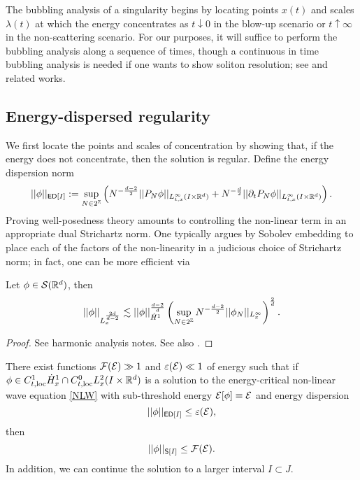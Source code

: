 
The bubbling analysis of a singularity begins by locating points $x(t)$ and scales $\lambda (t)$ at which the energy concentrates as $t \downarrow 0$ in the blow-up scenario or $t \uparrow \infty$ in the non-scattering scenario. For our purposes, it will suffice to perform the bubbling analysis along a sequence of times, though a continuous in time bubbling analysis is needed if one wants to show soliton resolution; see \cite{JendrejLawrie2023} and related works. 

\subsection{Energy-dispersed regularity}

We first locate the points and scales of concentration by showing that, if the energy does not concentrate, then the solution is regular. Define the energy dispersion norm
	\[
		||\phi||_{\mathsf{ED}[I]} 
			:= \sup_{N \in 2^\mathbb Z} \left( N^{-\frac{d - 2}{2}} ||P_N \phi||_{L^\infty_{t, x} (I \times \mathbb R^d)} + N^{ - \frac{d}{2}} ||\partial_t P_N \phi||_{L^\infty_{t, x} (I \times \mathbb R^d)} \right).
	\]
Proving well-posedness theory amounts to controlling the non-linear term in an appropriate dual Strichartz norm. One typically argues by Sobolev embedding to place each of the factors of the non-linearity in a judicious choice of Strichartz norm; in fact, one can be more efficient via

\begin{lemma}
	Let $\phi \in \mathcal S (\mathbb R^d)$, then 
		\begin{equation}
			||\phi||_{L^{\frac{2d}{d - 2}}_x} \lesssim ||\phi||_{\dot H^1}^{\frac{d - 2}{d}} \left( \sup_{N \in 2^\mathbb Z} N^{- \frac{d - 2}{2}}||\phi_N||_{L^\infty_x}\right)^{\frac2d}.
		\end{equation}
\end{lemma}

\begin{proof}
	See harmonic analysis notes. See also \cite[Theorem 2.43]{BahouriEtAl2011}.
\end{proof}

\begin{theorem}
	There exist functions $\mathcal F(\mathcal E) \gg 1$ and $\varepsilon(\mathcal E) \ll 1$ of energy such that if $\phi \in C^1_{t, \mathrm{loc}} \dot H^1_x \cap C^0_{t, \mathrm{loc}} L^2_x (I \times \mathbb R^d)$ is a solution to the energy-critical non-linear wave equation \eqref{NLW} with sub-threshold energy $\mathcal E[\phi] \equiv \mathcal E$ and energy dispersion
		\[
			||\phi||_{\mathsf{ED}[I]} \leq \varepsilon(\mathcal E), 
		\]
	then
		\[
			||\phi||_{\mathsf S[I]} \leq \mathcal F(\mathcal E).
		\]
	In addition, we can continue the solution to a larger interval $I \subset J$. 
\end{theorem}


